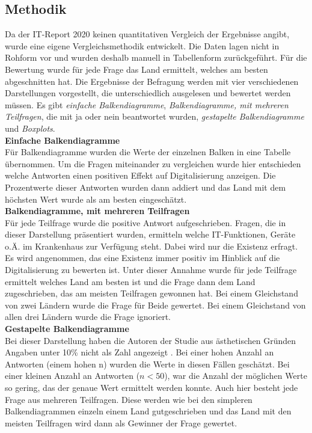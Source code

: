 \subsection{Methodik}
	Da der IT-Report 2020 keinen quantitativen Vergleich der Ergebnisse angibt, wurde eine eigene Vergleichsmethodik entwickelt. Die Daten lagen nicht in Rohform vor und wurden deshalb manuell in Tabellenform zurückgeführt. Für die Bewertung wurde für jede Frage das Land ermittelt, welches am besten abgeschnitten hat. Die Ergebnisse der Befragung werden mit vier verschiedenen Darstellungen vorgestellt, die unterschiedlich ausgelesen und bewertet werden müssen. Es gibt \textit{einfache Balkendiagramme}, \textit{Balkendiagramme, mit mehreren Teilfragen}, die mit ja oder nein beantwortet wurden, \textit{gestapelte Balkendiagramme} und \textit{Boxplots}.
	\vspace{1ex}\\
	\textbf{Einfache Balkendiagramme}\\
	Für Balkendiagramme wurden die Werte der einzelnen Balken in eine Tabelle übernommen. Um die Fragen miteinander zu vergleichen wurde hier entschieden welche Antworten einen positiven Effekt auf Digitalisierung anzeigen. Die Prozentwerte dieser Antworten wurden dann addiert und das Land mit dem höchsten Wert wurde als am besten eingeschätzt.
	\vspace{1ex}\\
	\textbf{Balkendiagramme, mit mehreren Teilfragen}\\
	Für jede Teilfrage wurde die positive Antwort aufgeschrieben.	Fragen, die in dieser Darstellung präsentiert wurden, ermitteln welche IT-Funktionen, Geräte o.Ä. im Krankenhaus zur Verfügung steht. Dabei wird nur die Existenz erfragt. Es wird angenommen, das eine Existenz immer positiv im Hinblick auf die Digitalisierung zu bewerten ist. Unter dieser Annahme wurde für jede Teilfrage ermittelt welches Land am besten ist und die Frage dann dem Land zugeschrieben, das am meisten Teilfragen gewonnen hat. Bei einem Gleichstand von zwei Ländern wurde die Frage für Beide gewertet. Bei einem Gleichstand von allen drei Ländern wurde die Frage ignoriert.
	\vspace{1ex}\\
	\textbf{Gestapelte Balkendiagramme}\\
	Bei dieser Darstellung haben die Autoren der Studie aus ästhetischen Gründen Angaben unter 10\% nicht als Zahl angezeigt \parencite[298]{huebner2020}. Bei einer hohen Anzahl an Antworten (einem hohen n) wurden die Werte in diesen Fällen geschätzt. Bei einer kleinen Anzahl an Antworten ($n<50$), war die Anzahl der möglichen Werte so gering, das der genaue Wert ermittelt werden konnte. Auch hier besteht jede Frage aus mehreren Teilfragen. Diese werden wie bei den simpleren Balkendiagrammen einzeln einem Land gutgeschrieben und das Land mit den meisten Teilfragen wird dann als Gewinner der Frage gewertet.

